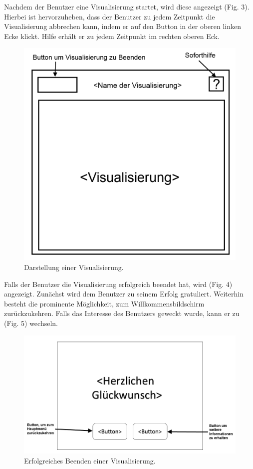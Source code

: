 \documentclass{article}
\begin{document}
Nachdem der Benutzer eine Visualisierung startet, wird diese angezeigt (Fig. 3). Hierbei ist hervorzuheben, dass der Benutzer zu jedem Zeitpunkt die Visualisierung abbrechen kann, indem er auf den Button in der oberen linken Ecke klickt. Hilfe erhält er zu jedem Zeitpunkt im rechten oberen Eck.

\begin{figure}[H]
  \centering
    \includegraphics[width=\textwidth]{resources/ui_walkthrough_visualisation-draft}
  \caption{Darstellung einer Visualisierung.}
\end{figure}

Falls der Benutzer die Visualisierung erfolgreich beendet hat, wird (Fig. 4) angezeigt. Zunächst wird dem Benutzer zu seinem Erfolg gratuliert. Weiterhin besteht die prominente Möglichkeit, zum Willkommensbildschirm zurückzukehren. Falls das Interesse des Benutzers geweckt wurde, kann er zu (Fig. 5) wechseln.

\begin{figure}[H]
  \centering
    \includegraphics[width=\textwidth]{resources/ui_walkthrough_end-draft}
  \caption{Erfolgreiches Beenden einer Visualisierung.}
\end{figure}
\end{document}
